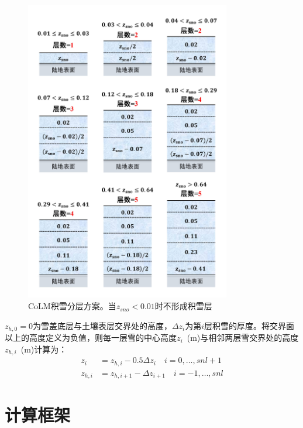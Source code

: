 {
\begin{figure}[htbp]
\centering
\includegraphics[width=0.8\textwidth]{Figures/模式构架/积雪分层.jpg}
\caption[CoLM积雪分层方案]{CoLM积雪分层方案。当$z_{sno}<0.01$时不形成积雪层}
\label{fig:积雪分层}
\end{figure}
}
    
$z_{h,0}=0$为雪盖底层与土壤表层交界处的高度，$\Delta z_{i}$为第$i$层积雪的厚度。将交界面以上的高度定义为负值，则每一层雪的中心高度$z_i$~(m)与相邻两层雪交界处的高度$z_{h,i}$~(m)计算为：
\begin{equation}
\begin{aligned}
z_{i} &= z_{h, i}-0.5 \Delta z_{i} \quad i=0, \ldots, snl+1 \\ 
z_{h, i} &= z_{h, i+1}-\Delta z_{i+1}  \quad i=-1, \ldots, snl
\end{aligned}
\end{equation}


\section{计算框架}\label{计算框架}

